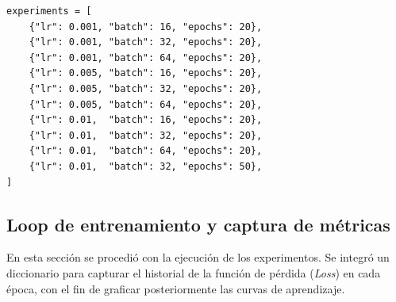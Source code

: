 \documentclass[conference]{IEEEtran}
\begin{document}
\begin{lstlisting}[caption={Definición de los diez experimentos}, label={lst:experiments}]
experiments = [
    {"lr": 0.001, "batch": 16, "epochs": 20},
    {"lr": 0.001, "batch": 32, "epochs": 20},
    {"lr": 0.001, "batch": 64, "epochs": 20},
    {"lr": 0.005, "batch": 16, "epochs": 20},
    {"lr": 0.005, "batch": 32, "epochs": 20},
    {"lr": 0.005, "batch": 64, "epochs": 20},
    {"lr": 0.01,  "batch": 16, "epochs": 20},
    {"lr": 0.01,  "batch": 32, "epochs": 20},
    {"lr": 0.01,  "batch": 64, "epochs": 20},
    {"lr": 0.01,  "batch": 32, "epochs": 50},
]
\end{lstlisting}

\subsection{Loop de entrenamiento y captura de métricas}

En esta sección se procedió con la ejecución de los experimentos. Se integró un diccionario para capturar el historial de la función de pérdida (\textit{Loss}) en cada época, con el fin de graficar posteriormente las curvas de aprendizaje.
\end{document}
